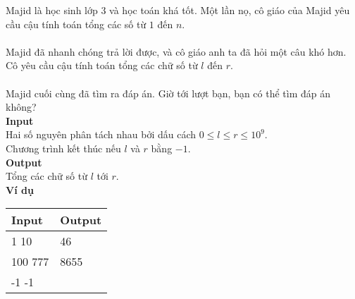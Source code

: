 Majid là học sinh lớp 3 và học toán khá tốt. Một lần nọ, cô giáo của Majid yêu cầu cậu tính toán tổng các số từ $1$ đến $n$.
\\
\\
Majid đã nhanh chóng trả lời được, và cô giáo anh ta đã hỏi một câu khó hơn. Cô yêu cầu cậu tính toán tổng các chữ số từ $l$ đến $r$.
\\
\\
Majid cuối cùng đã tìm ra đáp án. Giờ tới lượt bạn, bạn có thể tìm đáp án không?
\\

\textbf{Input}
\\
Hai số nguyên phân tách nhau bởi dấu cách $0 \leq l \leq r \leq 10^{9}$.
\\
Chương trình kết thúc nếu $l$ và $r$ bằng $-1$.
\\

\textbf{Output}
\\
Tổng các chữ số từ $l$ tới $r$.
\\

\textbf{Ví dụ}
\begin{table}[h!]
    \begin{center}
        \begin{tabular}{|p{6cm}|p{6cm}|}
            \hline
            \textbf{Input} & \textbf{Output} \\ 
            \hline
                1 10 & 46 \\
                100 777 & 8655 \\
                -1 -1 & \\
            \hline
        \end{tabular}
    \end{center}
\end{table}



